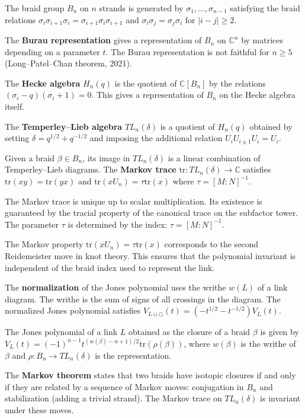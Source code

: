 The braid group $B_n$ on $n$ strands is generated by $\sigma_1, \ldots, \sigma_{n-1}$ satisfying the braid relations $\sigma_i \sigma_{i+1} \sigma_i = \sigma_{i+1} \sigma_i \sigma_{i+1}$ and $\sigma_i \sigma_j = \sigma_j \sigma_i$ for $|i-j| \geq 2$.

The \textbf{Burau representation} gives a representation of $B_n$ on $\mathbb{C}^n$ by matrices depending on a parameter $t$. The Burau representation is not faithful for $n \geq 5$ (Long--Patel--Chan theorem, 2021).

The \textbf{Hecke algebra} $H_n(q)$ is the quotient of $\mathbb{C}[B_n]$ by the relations $(\sigma_i - q)(\sigma_i + 1) = 0$. This gives a representation of $B_n$ on the Hecke algebra itself.

The \textbf{Temperley--Lieb algebra} $TL_n(\delta)$ is a quotient of $H_n(q)$ obtained by setting $\delta = q^{1/2} + q^{-1/2}$ and imposing the additional relation $U_i U_{i\pm 1} U_i = U_i$.

Given a braid $\beta \in B_n$, its image in $TL_n(\delta)$ is a linear combination of Temperley--Lieb diagrams. The \textbf{Markov trace} $\text{tr}: TL_n(\delta) \to \mathbb{C}$ satisfies $\text{tr}(xy) = \text{tr}(yx)$ and $\text{tr}(xU_n) = \tau \text{tr}(x)$ where $\tau = [M:N]^{-1}$.

The Markov trace is unique up to scalar multiplication. Its existence is guaranteed by the tracial property of the canonical trace on the subfactor tower. The parameter $\tau$ is determined by the index: $\tau = [M:N]^{-1}$.

The Markov property $\text{tr}(xU_n) = \tau \text{tr}(x)$ corresponds to the second Reidemeister move in knot theory. This ensures that the polynomial invariant is independent of the braid index used to represent the link.

The \textbf{normalization} of the Jones polynomial uses the writhe $w(L)$ of a link diagram. The writhe is the sum of signs of all crossings in the diagram. The normalized Jones polynomial satisfies $V_{L \sqcup \bigcirc}(t) = (-t^{1/2} - t^{-1/2}) V_L(t)$.

The Jones polynomial of a link $L$ obtained as the closure of a braid $\beta$ is given by $V_L(t) = (-1)^{n-1} t^{(w(\beta)-n+1)/2} \text{tr}(\rho(\beta))$, where $w(\beta)$ is the writhe of $\beta$ and $\rho: B_n \to TL_n(\delta)$ is the representation.

The \textbf{Markov theorem} states that two braids have isotopic closures if and only if they are related by a sequence of Markov moves: conjugation in $B_n$ and stabilization (adding a trivial strand). The Markov trace on $TL_n(\delta)$ is invariant under these moves.

